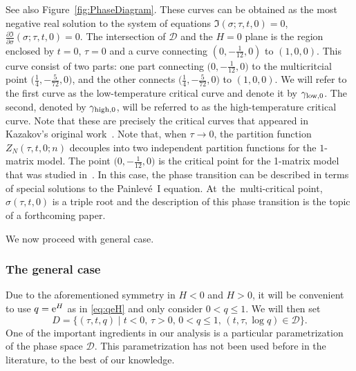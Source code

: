 \documentclass[pdftex]{sigma}
\numberwithin{equation}{section}
\begin{document}
 See also Figure~\ref{fig:PhaseDiagram}. These curves can be obtained as the most negative real solution to the system of equations $\mathfrak{I}(\sigma;\tau,t,0) = 0$, $\frac{\partial \mathfrak{I}}{\partial \sigma}(\sigma;\tau,t,0) = 0$. The intersection of $\mathcal D$ and the $H=0$ plane is the region enclosed by $t=0$, $\tau=0$ and a curve connecting $(0,-\frac{1}{12},0)$ to $(1,0,0)$. This curve consist of two parts: one part connecting $\bigl(0,-\frac{1}{12},0\bigr)$ to the multicritcial point $\bigl(\frac{1}{4},-\frac{5}{72},0\bigr)$, and the other connects $\bigl(\frac{1}{4},-\frac{5}{72},0\bigr)$ to $(1,0,0)$. We will refer to the first curve as the low-temperature critical curve and denote it by $\gamma_{{\rm low},0}$. The second, denoted by $\gamma_{{\rm high},0}$, will be referred to as the high-temperature critical curve. Note that these are precisely the critical curves that appeared in Kazakov's original work~\cite{Kazakov1}. Note that, when $\tau\to 0$, the partition function $Z_N(\tau,t,0;n)$ decouples into two independent partition functions for the $1$-matrix model. The point $\bigl(0,-\frac{1}{12},0\bigr)$ is the critical point for the 1-matrix model that was studied in~\cite{DK0, FIK1,FIK2}. In this case, the phase transition can be described in terms of special solutions to the Painlev\'e~I equation. At~the~multi-critical point, $\sigma(\tau,t,0)$ is a triple root and the description of this phase transition is the topic of a forthcoming paper.

 We now proceed with general case.
 \subsubsection{The general case}

 Due to the aforementioned symmetry in $H<0$ and $H>0$, it will be convenient to use $q={\rm e}^{H}$ as in \eqref{eq:qeH} and only consider $0< q \leq 1$. We will then set
\[
 D=\{(\tau,t,q) \mid t<0, \, \tau>0,\, 0<q \leq 1, \, (t,\tau,\log q) \in \mathcal{D}\}.
 \]
One of the important ingredients in our analysis is a particular parametrization of the phase space $\mathcal D$. This parametrization has not been used before in the literature, to the best of our knowledge.
\end{document}
